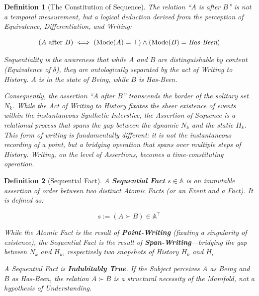 \documentclass[11pt, a4paper]{article}
\theoremstyle{formalism}
\newtheorem{formalism}{Definition}
\begin{document}
\begin{formalism}[The Constitution of Sequence]
    The relation ``$A$ is after $B$'' is not a temporal measurement, but a 
    logical deduction derived from the perception of Equivalence, Differentiation, 
    and Writing:
    
    \begin{equation}
        (A \text{ after } B) \iff (\text{Mode}(A) = \top) \land (\text{Mode}(B) = \text{\itshape Has-Been})
    \end{equation}
    
    Sequentiality is the awareness that while $A$ and $B$ are distinguishable 
    by content (Equivalence of $\delta$), they are ontologically separated by 
    the act of Writing to History. $A$ is in the state of \textit{Being}, while 
    $B$ is \textit{Has-Been}.

	Consequently, the assertion ``$A$ after $B$'' transcends the border of the
    solitary set $N_k$. While the \textit{Act of Writing to History} fixates the
    sheer existence of events within the instantaneous Synthetic Interstice, the
    \textit{Assertion of Sequence} is a relational process that spans the gap
    between the dynamic $N_k$ and the static $H_k$. This form of writing is
    fundamentally different: it is not the instantaneous recording of a point, but
    a bridging operation that spans over multiple steps of History. Writing, on the
    level of Assertions, becomes a \textit{time-constituting} operation.

\end{formalism}

\begin{formalism}[Sequential Fact]

	A \textbf{Sequential Fact} $s\in\mathbb{A}$ is an immutable assertion of
    order between two distinct Atomic Facts (or an Event and a Fact). It is defined
    as:
    
    \begin{equation}
        s := (A \succ B) \in \mathbb{A}^\top
    \end{equation}

    While the Atomic Fact is the result of \textbf{Point-Writing} (fixating a 
    singularity of existence), the Sequential Fact is the result of 
    \textbf{Span-Writing}---bridging the gap between $N_k$ and $H_k$, respectively
    two snapshots of History $H_k$ and $H_i$.

    A Sequential Fact is \textbf{Indubitably True}. If the Subject 
    perceives $A$ as \textit{Being} and $B$ as \textit{Has-Been}, the 
    relation $A \succ B$ is a structural necessity of the Manifold, not a 
    hypothesis of Understanding.
        
\end{formalism}
\end{document}
